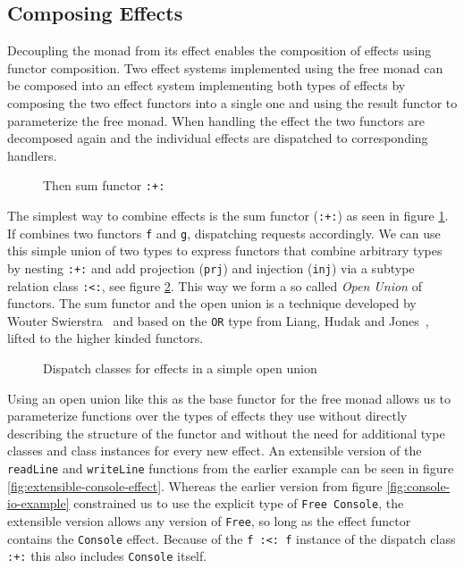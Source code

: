 \subsection{Composing Effects}

\label{sec:simple-effect-composition}

Decoupling the monad from its effect enables the composition of effects using
functor composition. Two effect systems implemented using the free monad can be
composed into an effect system implementing both types of effects by composing
the two effect functors into a single one and using the result functor to
parameterize the free monad. When handling the effect the two functors are
decomposed again and the individual effects are dispatched to corresponding
handlers.

\begin{figure}
  
  \caption{Then sum functor \texttt{:+:}}
  \label{fig:sum-functor}
\end{figure}

The simplest way to combine effects is the sum functor (\texttt{:+:}) as seen in
figure \ref{fig:sum-functor}. If combines two functors \texttt{f} and
\texttt{g}, dispatching requests accordingly. We can use this simple union of
two types to express functors that combine arbitrary types by nesting
\texttt{:+:} and add projection (\texttt{prj}) and injection (\texttt{inj}) via
a subtype relation class \texttt{:<:}, see figure \ref{fig:dispatch-class}. This
way we form a so called \emph{Open Union} of functors. The sum functor and the
open union is a technique developed by Wouter
Swierstra~\cite{data-types-a-la-carte} and based on the \texttt{OR} type from
Liang, Hudak and Jones~\cite{monad-transformers}, lifted to the higher kinded
functors.

\begin{figure}
  
  \caption{Dispatch classes for effects in a simple open union}
  \label{fig:dispatch-class}
\end{figure}

Using an open union like this as the base functor for the free monad allows us
to parameterize functions over the types of effects they use without directly
describing the structure of the functor and without the need for additional type
classes and class instances for every new effect. An extensible version of the
\texttt{readLine} and \texttt{writeLine} functions from the earlier example can
be seen in figure \ref{fig:extensible-console-effect}. Whereas the earlier
version from figure \ref{fig:console-io-example} constrained us to use the
explicit type of \texttt{Free Console}, the extensible version allows any
version of \texttt{Free}, so long as the effect functor contains the
\texttt{Console} effect. Because of the \texttt{f :<: f} instance of the
dispatch class \texttt{:+:} this also includes \texttt{Console} itself.

